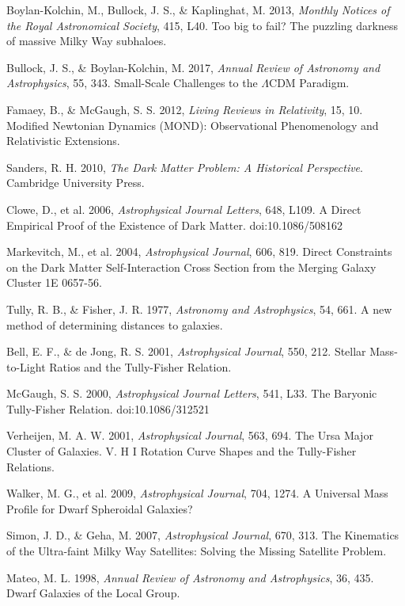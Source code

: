 \documentclass[fleqn,usenatbib]{mnras}
\begin{document}
\begin{thebibliography}{99}
 Boylan-Kolchin, M., Bullock, J. S., \& Kaplinghat, M. 2013, \textit{Monthly Notices of the Royal Astronomical Society}, 415, L40. Too big to fail? The puzzling darkness of massive Milky Way subhaloes.

 Bullock, J. S., \& Boylan-Kolchin, M. 2017, \textit{Annual Review of Astronomy and Astrophysics}, 55, 343. Small-Scale Challenges to the $\Lambda$CDM Paradigm.

 Famaey, B., \& McGaugh, S. S. 2012, \textit{Living Reviews in Relativity}, 15, 10. Modified Newtonian Dynamics (MOND): Observational Phenomenology and Relativistic Extensions.

 Sanders, R. H. 2010, \textit{The Dark Matter Problem: A Historical Perspective}. Cambridge University Press.

 Clowe, D., et al. 2006, \textit{Astrophysical Journal Letters}, 648, L109. A Direct Empirical Proof of the Existence of Dark Matter. doi:10.1086/508162

 Markevitch, M., et al. 2004, \textit{Astrophysical Journal}, 606, 819. Direct Constraints on the Dark Matter Self-Interaction Cross Section from the Merging Galaxy Cluster 1E 0657-56.

 Tully, R. B., \& Fisher, J. R. 1977, \textit{Astronomy and Astrophysics}, 54, 661. A new method of determining distances to galaxies.

 Bell, E. F., \& de Jong, R. S. 2001, \textit{Astrophysical Journal}, 550, 212. Stellar Mass-to-Light Ratios and the Tully-Fisher Relation.

 McGaugh, S. S. 2000, \textit{Astrophysical Journal Letters}, 541, L33. The Baryonic Tully-Fisher Relation. doi:10.1086/312521

 Verheijen, M. A. W. 2001, \textit{Astrophysical Journal}, 563, 694. The Ursa Major Cluster of Galaxies. V. H I Rotation Curve Shapes and the Tully-Fisher Relations.

 Walker, M. G., et al. 2009, \textit{Astrophysical Journal}, 704, 1274. A Universal Mass Profile for Dwarf Spheroidal Galaxies?

 Simon, J. D., \& Geha, M. 2007, \textit{Astrophysical Journal}, 670, 313. The Kinematics of the Ultra-faint Milky Way Satellites: Solving the Missing Satellite Problem.

 Mateo, M. L. 1998, \textit{Annual Review of Astronomy and Astrophysics}, 36, 435. Dwarf Galaxies of the Local Group.


\end{thebibliography}
\end{document}
